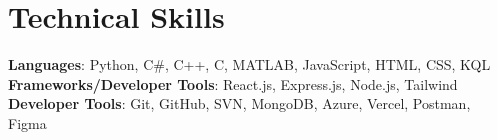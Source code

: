 \section{Technical Skills}
 \begin{itemize}[leftmargin=0.15in, label={}]
    \small{\item{
      \textbf{Languages}{: Python, C\#, C++, C, MATLAB, JavaScript, HTML, CSS, KQL} \\
      \textbf{Frameworks/Developer Tools}{: React.js, Express.js, Node.js, Tailwind} \\
      \textbf{Developer Tools}{: Git, GitHub, SVN, MongoDB, Azure, Vercel, Postman, Figma} \\
      }}
\end{itemize} 